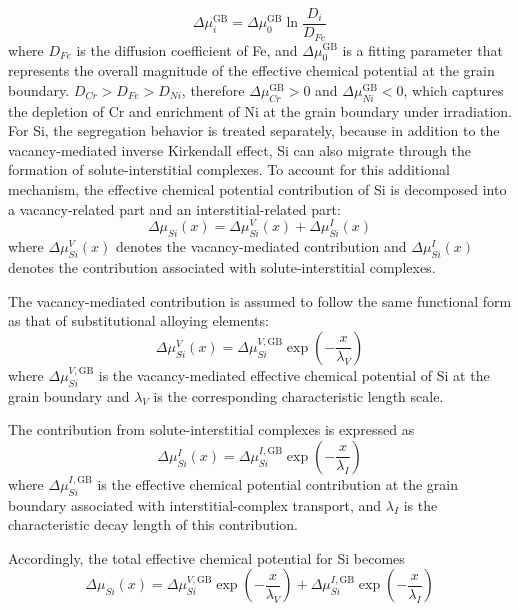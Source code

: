 \documentclass[12pt]{article}
\begin{document}
\begin{equation}\label{equ:muCrNigb}
\Delta \mu_i^{\mathrm{GB}} = \Delta \mu_0^{\mathrm{GB}} \ln \frac{D_i}{D_{Fe}} 
\end{equation}
where \(D_{Fe}\) is the diffusion coefficient of Fe, and \(\Delta \mu_0^{\mathrm{GB}}\) is a fitting parameter that represents the overall magnitude of the effective chemical potential at the grain boundary. \(D_{Cr}>D_{Fe}>D_{Ni}\), therefore \(\Delta \mu_{Cr}^{\mathrm{GB}}>0\) and \(\Delta \mu_{Ni}^{\mathrm{GB}}<0\), which captures the depletion of Cr and enrichment of Ni at the grain boundary under irradiation. For Si, the segregation behavior is treated separately, because in addition to the vacancy-mediated inverse Kirkendall effect, Si can also migrate through the formation of solute-interstitial complexes. To account for this additional mechanism, the effective chemical potential contribution of Si is decomposed into a vacancy-related part and an interstitial-related part:
\begin{equation}\label{equ:muSiDecomp}
\Delta \mu_{Si}(x) = \Delta \mu_{Si}^{V}(x) + \Delta \mu_{Si}^{I}(x)
\end{equation}
where \(\Delta \mu_{Si}^{V}(x)\) denotes the vacancy-mediated contribution and \(\Delta \mu_{Si}^{I}(x)\) denotes the contribution associated with solute-interstitial complexes.

The vacancy-mediated contribution is assumed to follow the same functional form as that of substitutional alloying elements:
\begin{equation}\label{equ:muSiV}
\Delta \mu_{Si}^{V}(x) = \Delta \mu_{Si}^{V,\mathrm{GB}} \exp\left(-\frac{x}{\lambda_V}\right)
\end{equation}
where \(\Delta \mu_{Si}^{V,\mathrm{GB}}\) is the vacancy-mediated effective chemical potential of Si at the grain boundary and \(\lambda_V\) is the corresponding characteristic length scale.

The contribution from solute-interstitial complexes is expressed as
\begin{equation}\label{equ:muSiI}
\Delta \mu_{Si}^{I}(x) = \Delta \mu_{Si}^{I,\mathrm{GB}} \exp\left(-\frac{x}{\lambda_I}\right)
\end{equation}
where \(\Delta \mu_{Si}^{I,\mathrm{GB}}\) is the effective chemical potential contribution at the grain boundary associated with interstitial-complex transport, and \(\lambda_I\) is the characteristic decay length of this contribution.

Accordingly, the total effective chemical potential for Si becomes
\begin{equation}\label{equ:muSiTotal}
\Delta \mu_{Si}(x)
=
\Delta \mu_{Si}^{V,\mathrm{GB}} \exp\left(-\frac{x}{\lambda_V}\right)
+
\Delta \mu_{Si}^{I,\mathrm{GB}} \exp\left(-\frac{x}{\lambda_I}\right)
\end{equation}
\end{document}
